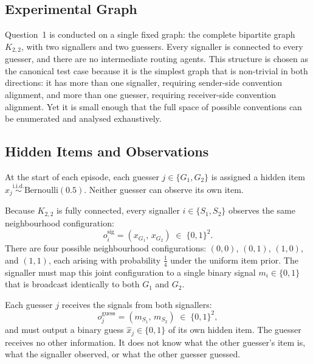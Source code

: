 \documentclass[a4paper,twoside,12pt]{report}
\begin{document}
    \subsection{Experimental Graph}
    
    Question~1 is conducted on a single fixed graph: the complete bipartite graph
    $K_{2,2}$, with two signallers and two guessers. Every signaller is connected
    to every guesser, and there are no intermediate routing agents. This structure
    is chosen as the canonical test case because it is the simplest graph that is
    non-trivial in both directions: it has more than one signaller, requiring
    sender-side convention alignment, and more than one guesser, requiring
    receiver-side convention alignment. Yet it is small enough that the full space
    of possible conventions can be enumerated and analysed exhaustively.
    
    
    \subsection{Hidden Items and Observations}
    
    At the start of each episode, each guesser $j \in \{G_1, G_2\}$ is assigned a
    hidden item $x_j \overset{\text{i.i.d.}}{\sim} \mathrm{Bernoulli}(0.5)$.
    Neither guesser can observe its own item.
    
    Because $K_{2,2}$ is fully connected, every signaller $i \in \{S_1, S_2\}$
    observes the same neighbourhood configuration:
    \begin{equation}
        o_i^{\mathrm{sig}} = (x_{G_1},\, x_{G_2}) \;\in\; \{0,1\}^2.
    \end{equation}
    There are four possible neighbourhood configurations:
    $(0,0)$, $(0,1)$, $(1,0)$, and $(1,1)$, each arising with probability
    $\tfrac{1}{4}$ under the uniform item prior. The signaller must map this
    joint configuration to a single binary signal $m_i \in \{0,1\}$ that is
    broadcast identically to both $G_1$ and $G_2$.
    
    Each guesser $j$ receives the signals from both signallers:
    \begin{equation}
        o_j^{\mathrm{guess}} = (m_{S_1},\, m_{S_2}) \;\in\; \{0,1\}^2,
    \end{equation}
    and must output a binary guess $\hat{x}_j \in \{0,1\}$ of its own hidden item.
    The guesser receives no other information. It does not know what the other
    guesser's item is, what the signaller observed, or what the other guesser
    guessed.
    
\end{document}
